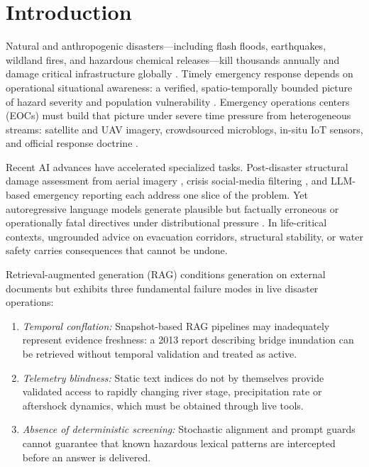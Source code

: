 \documentclass[conference]{IEEEtran}
\begin{document}
\section{Introduction}
Natural and anthropogenic disasters---including flash floods, earthquakes, wildland fires, and hazardous chemical releases---kill thousands annually and damage critical infrastructure globally \cite{undrr}. Timely emergency response depends on operational situational awareness: a verified, spatio-temporally bounded picture of hazard severity and population vulnerability \cite{endsley,aboualola2023}. Emergency operations centers (EOCs) must build that picture under severe time pressure from heterogeneous streams: satellite and UAV imagery, crowdsourced microblogs, in-situ IoT sensors, and official response doctrine \cite{crisismmd,aboualola2023}.

Recent AI advances have accelerated specialized tasks. Post-disaster structural damage assessment from aerial imagery \cite{singh}, crisis social-media filtering \cite{olteanu2015,dinani}, and LLM-based emergency reporting \cite{cantini} each address one slice of the problem. Yet autoregressive language models generate plausible but factually erroneous or operationally fatal directives under distributional pressure \cite{ji,yu2024}. In life-critical contexts, ungrounded advice on evacuation corridors, structural stability, or water safety carries consequences that cannot be undone.

Retrieval-augmented generation (RAG) \cite{lewis} conditions generation on external documents but exhibits three fundamental failure modes in live disaster operations:
\begin{enumerate}
    \item \textit{Temporal conflation:} Snapshot-based RAG pipelines may inadequately represent evidence freshness: a 2013 report describing bridge inundation can be retrieved without temporal validation and treated as active.
    \item \textit{Telemetry blindness:} Static text indices do not by themselves provide validated access to rapidly changing river stage, precipitation rate or aftershock dynamics, which must be obtained through live tools.
    \item \textit{Absence of deterministic screening:} Stochastic alignment and prompt guards cannot guarantee that known hazardous lexical patterns are intercepted before an answer is delivered.
\end{enumerate}
\end{document}
